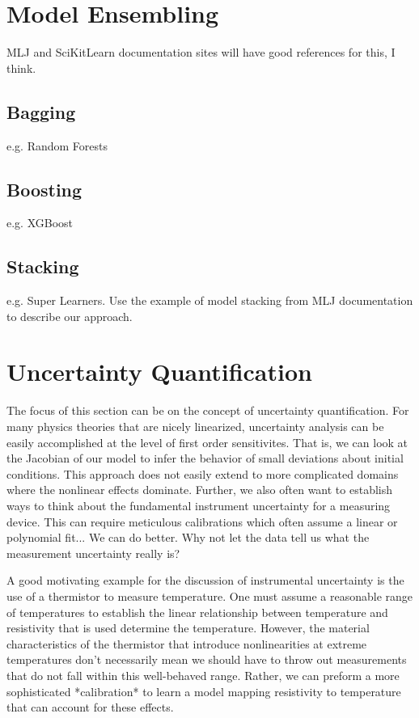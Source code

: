 
\section{Model Ensembling}
MLJ and SciKitLearn documentation sites will have good references for this, I think.
\subsection{Bagging}
e.g. Random Forests
\subsection{Boosting}
e.g. XGBoost
\subsection{Stacking}
e.g. Super Learners. Use the example of model stacking from MLJ documentation to describe our approach.




\section{Uncertainty Quantification}
The focus of this section can be on the concept of uncertainty quantification. For many physics theories that are nicely linearized, uncertainty analysis can be easily accomplished at the level of first order sensitivites. That is, we can look at the Jacobian of our model to infer the behavior of small deviations about initial conditions. This approach does not easily extend to more complicated domains where the nonlinear effects dominate. Further, we also often want to establish ways to think about the fundamental instrument uncertainty for a measuring device. This can require meticulous calibrations which often assume a linear or polynomial fit... We can do better. Why not let the data tell us what the measurement uncertainty really is?

A good motivating example for the discussion of instrumental uncertainty is the use of a thermistor to measure temperature. One must assume a reasonable range of temperatures to establish the linear relationship between temperature and resistivity that is used determine the temperature. However, the material characteristics of the thermistor that introduce nonlinearities at extreme temperatures don't necessarily mean we should have to throw out measurements that do not fall within this well-behaved range. Rather, we can preform a more sophisticated *calibration* to learn a model mapping resistivity to temperature that can account for these effects.

